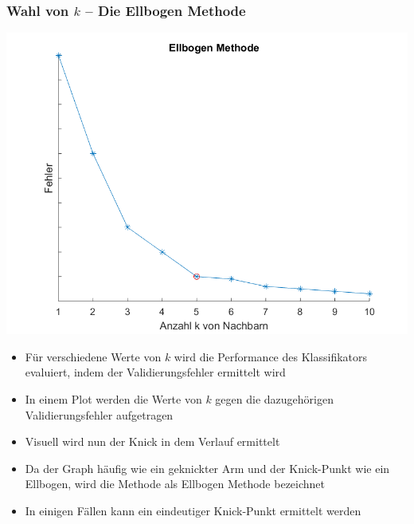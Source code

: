 \begin{frame}
\frametitle{Wahl von $k$ -- Die Ellbogen Methode}
\centering
\includegraphics[scale=0.4]{images/plot_elbow.png} 
\end{frame}
\begin{frame}
\begin{itemize}[<+->]
\item Für verschiedene Werte von $k$ wird die Performance des Klassifikators evaluiert, indem der Validierungsfehler ermittelt wird
\item In einem Plot werden die Werte von $k$ gegen die dazugehörigen Validierungsfehler aufgetragen
\item Visuell wird nun der \glqq Knick\grqq{} in dem Verlauf ermittelt
\item Da der Graph häufig wie ein geknickter Arm und der Knick-Punkt wie ein Ellbogen, wird die Methode als Ellbogen Methode bezeichnet
\item In einigen Fällen kann ein eindeutiger Knick-Punkt ermittelt werden
\end{itemize}
\end{frame}
